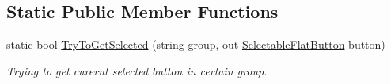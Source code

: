 \subsection*{Static Public Member Functions}
\begin{DoxyCompactItemize}
\item 
static bool \mbox{\hyperlink{class_wpf_handler_1_1_u_i_1_1_controls_1_1_selectable_flat_button_aab3702adeef6c8a17aa65bfb91081fd4}{Try\+To\+Get\+Selected}} (string group, out \mbox{\hyperlink{class_wpf_handler_1_1_u_i_1_1_controls_1_1_selectable_flat_button}{Selectable\+Flat\+Button}} button)
\begin{DoxyCompactList}\small\item\em Trying to get curernt selected button in certain group. \end{DoxyCompactList}\end{DoxyCompactItemize}
